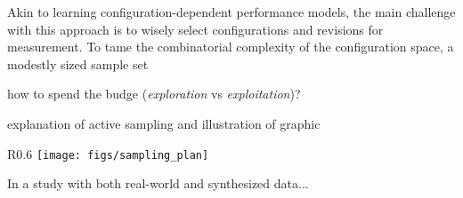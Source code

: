 \documentclass[utf8,biblatex]{lni}
\begin{document}
Akin to learning configuration-dependent performance models, the main challenge with this approach is to wisely select configurations and revisions for measurement. To tame the combinatorial complexity of the configuration space, a modestly sized sample set 


\begin{compactitem}
	\item how to spend the budge (\textit{exploration} vs \textit{exploitation})?
	\item explanation of active sampling and illustration of graphic
\end{compactitem}

\begin{wrapfigure}{R}{0.6\linewidth}
	\centering
	\texttt{[image: figs/sampling\_plan]}
\end{wrapfigure}

In a study with both real-world and synthesized data...

\vfill
\printbibliography
\end{document}
